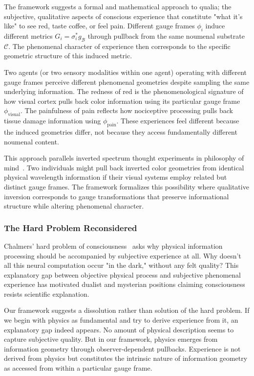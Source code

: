 \documentclass[11pt]{article}
\begin{document}
The framework suggests a formal and mathematical approach to qualia; the subjective, qualitative aspects of conscious experience that constitute "what it's like" to see red, taste coffee, or feel pain. Different gauge frames $\phi_i$ induce different metrics $G_i = \sigma_i^* g_{\mathcal{B}}$ through pullback from the same noumenal substrate $\mathcal{C}$. The phenomenal character of experience then corresponds to the specific geometric structure of this induced metric.

Two agents (or two sensory modalities within one agent) operating with different gauge frames perceive different phenomenal geometries despite sampling the same underlying information. The redness of red is the phenomenological signature of how visual cortex pulls back color information using its particular gauge frame $\phi_{\text{visual}}$. The painfulness of pain reflects how nociceptive processing pulls back tissue damage information using $\phi_{\text{pain}}$. These experiences feel different because the induced geometries differ, not because they access fundamentally different noumenal content.

This approach parallels inverted spectrum thought experiments in philosophy of mind~\cite{Shoemaker1982}. Two individuals might pull back inverted color geometries from identical physical wavelength information if their visual systems employ related but distinct gauge frames. The framework formalizes this possibility where qualitative inversion corresponds to gauge transformations that preserve informational structure while altering phenomenal character.

\subsubsection{The Hard Problem Reconsidered}

Chalmers' hard problem of consciousness~\cite{Chalmers1995,Chalmers1996} asks why physical information processing should be accompanied by subjective experience at all. Why doesn't all this neural computation occur "in the dark," without any felt quality? This explanatory gap between objective physical process and subjective phenomenal experience has motivated dualist and mysterian positions claiming consciousness resists scientific explanation.

Our framework suggests a dissolution rather than solution of the hard problem. If we begin with physics as fundamental and try to derive experience from it, an explanatory gap indeed appears. No amount of physical description seems to capture subjective quality. But in our framework, physics emerges from information geometry through observer-dependent pullbacks. Experience is not derived from physics but constitutes the intrinsic nature of information geometry as accessed from within a particular gauge frame.
\end{document}
